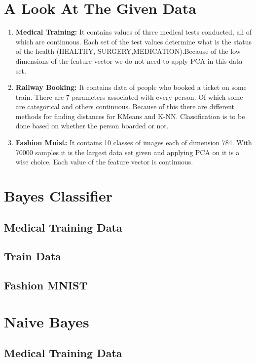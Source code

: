 \documentclass[conference]{IEEEtran}
\begin{document}
\section{A Look At The Given Data}
\begin{enumerate}
    \item \textbf{Medical Training:} It contains values of three medical tests conducted, all of which are continuous. Each set of the test values determine what is the status of the health (HEALTHY, SURGERY,MEDICATION).Because of the low dimensions of the feature vector we do not need to apply PCA in this data set.
    \item \textbf{Railway Booking:} It contains data of people who booked a ticket on some train. There are 7 parameters associated with every person. Of which some are categorical and others continuous. Because of this there are different methods for finding distances for KMeans and K-NN. Classification is to be done based on whether the person boarded or not.
    \item \textbf{Fashion Mnist:} It contains 10 classes of images each of dimension 784. With 70000 samples it is the largest data set given and applying PCA on it is a wise choice. Each value of the feature vector is continuous. 
\end{enumerate}

\section{Bayes Classifier}
\subsection{Medical Training Data}

\subsection{Train Data}

\subsection{Fashion MNIST}

\section{Naive Bayes}
\subsection{Medical Training Data}
\end{document}
